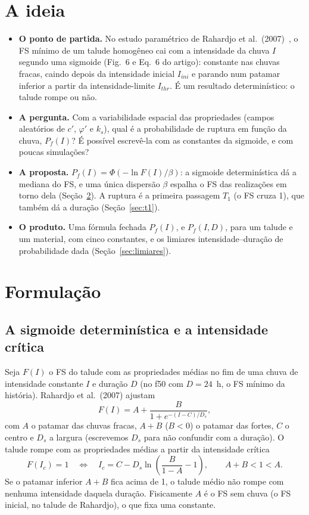 \documentclass[11pt,a4paper]{article}
\newcommand{\Pf}{P_f}
\begin{document}
\section{A ideia}\label{sec:ideia}
\begin{itemize}
  \item \textbf{O ponto de partida.} No estudo paramétrico de Rahardjo et al.\ (2007)~\cite{rahardjo2007}, o FS mínimo de um talude
    homogêneo cai com a intensidade da chuva $I$ segundo uma sigmoide (Fig.~6 e Eq.~6 do artigo): constante nas chuvas
    fracas, caindo depois da intensidade inicial $I_{ini}$ e parando num patamar inferior a partir da intensidade-limite
    $I_{thr}$. É um resultado determinístico: o talude rompe ou não.
  \item \textbf{A pergunta.} Com a variabilidade espacial das propriedades (campos aleatórios de $c'$, $\varphi'$ e
    $k_s$), qual é a probabilidade de ruptura em função da chuva, $\Pf(I)$? É possível escrevê-la com as constantes da
    sigmoide, e com poucas simulações?
  \item \textbf{A proposta.} $\Pf(I) = \Phi(-\ln F(I)/\beta)$: a sigmoide determinística dá a mediana do FS, e uma
    única dispersão $\beta$ espalha o FS das realizações em torno dela (Seção~\ref{sec:form}). A ruptura é a primeira
    passagem $T_1$ (o FS cruza 1), que também dá a duração (Seção~\ref{sec:t1}).
  \item \textbf{O produto.} Uma fórmula fechada $\Pf(I)$, e $\Pf(I, D)$, para um talude e um material, com cinco
    constantes, e os limiares intensidade--duração de probabilidade dada (Seção~\ref{sec:limiares}).
\end{itemize}

\section{Formulação}\label{sec:form}

\subsection{A sigmoide determinística e a intensidade crítica}
Seja $F(I)$ o FS do talude com as propriedades médias no fim de uma chuva de intensidade constante $I$ e duração $D$
(no f50 com $D = 24$~h, o FS mínimo da história). Rahardjo et al.\ (2007) ajustam
\begin{equation}
F(I) = A + \frac{B}{1 + e^{-(I - C)/D_s}},\label{eq:sig}
\end{equation}
com $A$ o patamar das chuvas fracas, $A + B$ ($B < 0$) o patamar das fortes, $C$ o centro e $D_s$ a largura
(escrevemos $D_s$ para não confundir com a duração). O talude rompe com as propriedades médias a partir da
intensidade crítica
\begin{equation}
F(I_c) = 1 \quad\Longleftrightarrow\quad I_c = C - D_s \ln\!\left(\frac{B}{1 - A} - 1\right),\qquad A + B < 1 < A.
\label{eq:ic}
\end{equation}
Se o patamar inferior $A + B$ fica acima de 1, o talude médio não rompe com nenhuma intensidade daquela duração.
Fisicamente $A$ é o FS sem chuva (o FS inicial, \FSzero{} no talude de Rahardjo), o que fixa uma constante.
\end{document}
